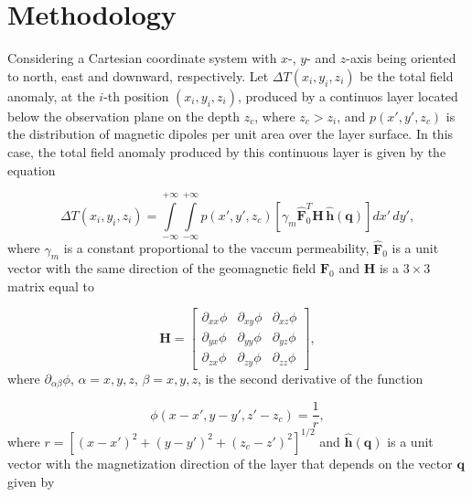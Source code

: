 \section{Methodology}
\label{sec:methodology}


Considering a Cartesian coordinate system with $x$-, $y$- and $z$-axis being oriented to north, east and downward, respectively. Let $\Delta T (x_i,y_i,z_i)$ be the total field anomaly, at the $i$-th position $(x_i,y_i,z_i)$, produced by a continuos layer located below the observation plane on the depth $z_c$, where $z_c > z_i$, and $p(x',y',z_c)$ is the distribution of magnetic dipoles per unit area over the layer surface. In this case, the total field anomaly produced by this continuous layer is given by the equation 

\begin{equation}
\Delta T(x_i,y_i,z_i) = \int \limits_{-\infty}^{+\infty } \int \limits_{-\infty}^{+\infty }  p(x',y',z_c)  [\gamma_m \hat{\mathbf{F}}_0^T \mathbf{H} \,\hat{\mathbf{h}}(\mathbf{q})] dx' \,dy',
\label{eq:continuous_layer}
\end{equation}
where $\gamma_m$ is a constant proportional to the vaccum permeability, $\hat{\mathbf{F}}_0$ is a unit vector with the same direction of the geomagnetic field $\mathbf{F}_0$ and $\mathbf{H}$ is a $3 \times 3$ matrix equal to  

 \begin{equation}
   \mathbf{H} =
   \left[ \begin{array}{ccc}
   \partial_{xx} \phi & \partial_{xy} \phi &\partial_{xz} \phi \\  \partial_{yx} \phi & \partial_{yy} \phi &\partial_{yz} \phi \\  \partial_{zx} \phi &\partial_{zy}\phi  & \partial_{zz} \phi    
   \end{array} \right] ,
   \label{eq:H}
 \end{equation}
where $\partial_{\alpha \beta}\phi$, $\alpha = x, y, z$, $\beta = x, y, z$, is the second derivative of the function 

\begin{equation}
   \phi (x-x',y-y',z'- z_c) = \frac{1}{r} ,
   \label{eq:phi}
 \end{equation}
where $r = [(x-x')^2 + (y-y')^2 + (z_c-z')^2]^{1/2}$ and $\hat{\mathbf{h}}(\mathbf{q})$ is a unit vector with the
magnetization direction of the layer that depends on the vector $\mathbf{q}$ given by 

